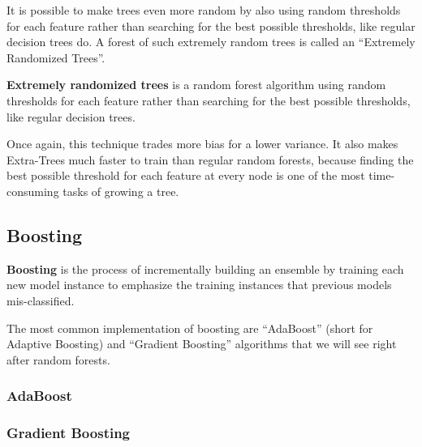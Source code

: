 It is possible to make trees even more random by also using random thresholds for each feature rather than searching
for the best possible thresholds, like regular decision trees do. A forest of such extremely random trees is called
an ``Extremely Randomized Trees''.

\textbf{Extremely randomized trees} is a random forest algorithm using random thresholds for each feature rather than
searching for the best possible thresholds, like regular decision trees.
\ed

Once again, this technique trades more bias for a lower variance. It also makes Extra-Trees much faster to train
than regular random forests, because finding the best possible threshold for each feature at every node is one of
the most time-consuming tasks of growing a tree.

\subsection{Boosting}

\bd[Boosting]
\textbf{Boosting} is the process of incrementally building an ensemble by training each new model instance to emphasize
the training instances that previous models mis-classified.
\ed


The most common implementation of boosting are ``AdaBoost'' (short for Adaptive  Boosting) and ``Gradient Boosting''
algorithms that we will see right after random forests.

\subsubsection{AdaBoost}

\subsubsection{Gradient Boosting}